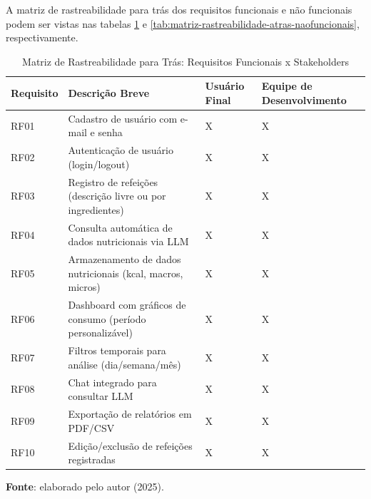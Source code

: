 A matriz de rastreabilidade para trás dos requisitos funcionais e não funcionais podem ser vistas nas tabelas \ref{tab:matriz-rastreabilidade-atras-funcionais} e \ref{tab:matriz-rastreabilidade-atras-naofuncionais}, respectivamente.

\begin{longtable}{|>{\centering\arraybackslash}p{}|>{\arraybackslash}p{}|>{\centering\arraybackslash}p{}|>{\centering\arraybackslash}p{}|}
    \caption{Matriz de Rastreabilidade para Trás: Requisitos Funcionais x Stakeholders}
    \label{tab:matriz-rastreabilidade-atras-funcionais}\\
    \hline 
    \textbf{Requisito} & \textbf{Descrição Breve} & \textbf{Usuário Final} & \textbf{Equipe de Desenvolvimento} \\
    \hline
    \endfirsthead
    \endhead
    RF01 & Cadastro de usuário com e-mail e senha & X & X \\
    \hline
    RF02 & Autenticação de usuário (login/logout) & X & X \\
    \hline
    RF03 & Registro de refeições (descrição livre ou por ingredientes) & X & X \\
    \hline
    RF04 & Consulta automática de dados nutricionais via LLM & X & X \\
    \hline
    RF05 & Armazenamento de dados nutricionais (kcal, macros, micros) & X & X \\
    \hline
    RF06 & Dashboard com gráficos de consumo (período personalizável) & X & X \\
    \hline
    RF07 & Filtros temporais para análise (dia/semana/mês) & X & X \\
    \hline
    RF08 & Chat integrado para consultar LLM & X & X \\
    \hline
    RF09 & Exportação de relatórios em PDF/CSV & X & X \\
    \hline
    RF10 & Edição/exclusão de refeições registradas & X & X \\
    \hline
\end{longtable}
\begin{center} \small{\textbf{Fonte}: elaborado pelo autor (2025).} \end{center}

